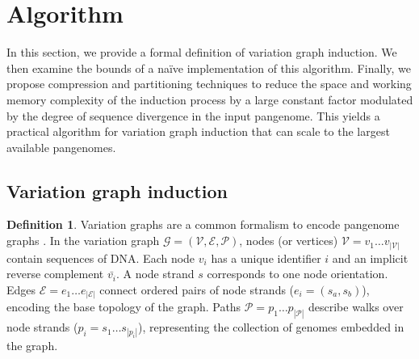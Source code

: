 \documentclass{bioinfo}
\theoremstyle{definition}
\newtheorem{definition}{Definition}[section]
\begin{document}




\section{Algorithm}
\label{sec:algorithm}

In this section, we provide a formal definition of variation graph induction.
We then examine the bounds of a na\"{i}ve implementation of this algorithm.
Finally, we propose compression and partitioning techniques to reduce the space and working memory complexity of the induction process by a large constant factor modulated by the degree of sequence divergence in the input pangenome.
This yields a practical algorithm for variation graph induction that can scale to the largest available pangenomes.

\subsection{Variation graph induction}

\begin{definition}
\label{def:vg}
Variation graphs are a common formalism to encode pangenome graphs \citep{Garrison_2019_thesis}.
In the variation graph $\mathcal{G} = (\mathcal{V}, \mathcal{E}, \mathcal{P})$, nodes (or vertices) $\mathcal{V} = v_1\ldots v_{|\mathcal{V}|}$ contain sequences of DNA.
Each node $v_i$ has a unique identifier $i$ and an implicit reverse complement $\bar{v_i}$.
A node strand $s$ corresponds to one node orientation.
Edges $\mathcal{E} = e_1\ldots e_{|\mathcal{E}|}$ connect ordered pairs of node strands ($e_i = ( s_a, s_b )$), encoding the base topology of the graph.
Paths $\mathcal{P} = p_1\ldots p_{|\mathcal{P}|}$ describe walks over node strands ($p_i = s_1 \ldots s_{|p_i|}$), representing the collection of genomes embedded in the graph.
\end{definition}
\end{document}
